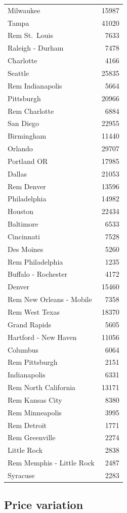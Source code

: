 \documentclass[
]{article}
\begin{document}
\begin{longtable}[]{@{}lr@{}}
Milwaukee & 15987 \\
Tampa & 41020 \\
Rem St.~Louis & 7633 \\
Raleigh - Durham & 7478 \\
Charlotte & 4166 \\
Seattle & 25835 \\
Rem Indianapolis & 5664 \\
Pittsburgh & 20966 \\
Rem Charlotte & 6884 \\
San Diego & 22955 \\
Birmingham & 11440 \\
Orlando & 29707 \\
Portland OR & 17985 \\
Dallas & 21053 \\
Rem Denver & 13596 \\
Philadelphia & 14982 \\
Houston & 22434 \\
Baltimore & 6533 \\
Cincinnati & 7528 \\
Des Moines & 5260 \\
Rem Philadelphia & 1235 \\
Buffalo - Rochester & 4172 \\
Denver & 15460 \\
Rem New Orleans - Mobile & 7358 \\
Rem West Texas & 18370 \\
Grand Rapids & 5605 \\
Hartford - New Haven & 11056 \\
Columbus & 6064 \\
Rem Pittsburgh & 2151 \\
Indianapolis & 6331 \\
Rem North California & 13171 \\
Rem Kansas City & 8380 \\
Rem Minneapolis & 3995 \\
Rem Detroit & 1771 \\
Rem Greenville & 2274 \\
Little Rock & 2838 \\
Rem Memphis - Little Rock & 2487 \\
Syracuse & 2283 \\
\end{longtable}

\subsection{Price variation}\label{price-variation}
\end{document}
